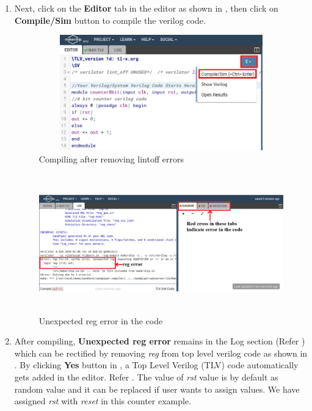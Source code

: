 \begin{enumerate}
\item Next, click on the \textbf{Editor} tab in the editor as shown in , then click on \textbf{Compile/Sim} button to compile the verilog code. 

\begin{figure}[H]
\centering
\includegraphics[width = 12cm, height =5cm]{./NgVeri/compile1.png}
\caption{Compiling after removing lintoff errors}
\label{compile1}
\end{figure}

\begin{figure}[H]
\centering
\includegraphics[width = 14cm, height =6cm]{./NgVeri/regerror.png}
\caption{ Unexpected reg error in the code}
\label{regerror}
\end{figure}

\item After compiling, \textbf{Unexpected reg error} remains in the Log section (Refer ) which can be rectified by removing \textit{reg} from top level verilog code as shown in . By clicking \textbf{Yes} button in , a Top Level Verilog (TLV) code automatically gets added in the editor. Refer . The value of \textit{rst} value is by default as random value and it can be replaced if user wants to assign values. We have assigned \textit{rst} with \textit{reset} in this counter example. 


\end{enumerate}
